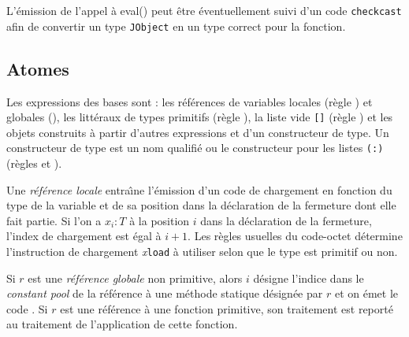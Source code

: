 L'\'emission de l'appel \`a eval() peut \^etre \'eventuellement suivi d'un
code \texttt{checkcast} afin de convertir un type \texttt{JObject} en un type
correct pour la fonction. 

\subsection{Atomes}

Les expressions des bases sont : les r\'ef\'erences de variables locales (r\`egle
) et globales (), les
litt\'eraux de types primitifs (r\`egle ), la liste vide
\texttt{[]} (r\`egle  ) et les \og
objets \fg construits \`a partir d'autres expressions et d'un
constructeur de type. Un constructeur de type est un nom qualifi\'e ou
le constructeur pour les listes \verb+(:)+ (r\`egles 
et ).

Une \emph{r\'ef\'erence locale} entra\^{\i}ne l'\'emission d'un code de
chargement en fonction du type de la variable et de sa position dans
la d\'eclaration de la fermeture dont elle fait partie. Si l'on a $x_i :
T$  \`a la position $i$ dans la d\'eclaration de la fermeture, l'index de
chargement est \'egal \`a $i+1$.  Les r\`egles usuelles du code-octet
d\'etermine l'instruction de chargement \textsl{x}\texttt{load} \`a
utiliser selon que le type est primitif ou non. 

Si $r$ est une \emph{r\'ef\'erence globale} non primitive, alors $i$ d\'esigne l'indice
dans le \emph{constant pool} de la r\'ef\'erence \`a une m\'ethode statique d\'esign\'ee par $r$
et on \'emet le code . Si $r$ est une
r\'ef\'erence \`a une fonction primitive, son traitement est report\'e au
traitement de l'application de cette fonction. 

